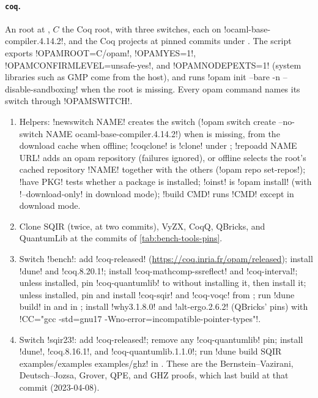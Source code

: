 {\paragraph{\texttt{coq}.} An  root at , $C$ the Coq root, with three switches, each on \code!ocaml-base-compiler.4.14.2!, and the Coq projects at pinned commits under . The script exports \code!OPAMROOT=C/opam!, \code!OPAMYES=1!, \code!OPAMCONFIRMLEVEL=unsafe-yes!, and \code!OPAMNODEPEXTS=1! (system libraries such as GMP come from the host), and runs \code!opam init --bare -n --disable-sandboxing! when the root is missing. Every opam command names its switch through \code!OPAMSWITCH!.
\begin{enumerate}
\item Helpers: \code!newswitch NAME! creates the switch (\code!opam switch create --no-switch NAME ocaml-base-compiler.4.14.2!) when  is missing, from the download cache when offline; \code!coqclone! is \code!clone! under ; \code!repoadd NAME URL! adds an opam repository (failures ignored), or offline selects the root's cached repository \code!NAME! together with the others (\code!opam repo set-repos!); \code!have PKG! tests whether a package is installed; \code!oinst! is \code!opam install! (with \code!--download-only! in download mode); \code!build CMD! runs \code!CMD! except in download mode.
\item Clone SQIR (twice, at two commits), VyZX, CoqQ, QBricks, and QuantumLib at the commits of \cref{tab:bench-tools-pins}.
\item Switch \code!bench!: add \code!coq-released! (\url{https://coq.inria.fr/opam/released}); install \code!dune! and \code!coq.8.20.1!; install \code!coq-mathcomp-ssreflect! and \code!coq-interval!; unless installed, pin \code!coq-quantumlib! to  without installing it, then install it; unless installed, pin and install \code!coq-sqir! and \code!coq-voqc! from ; run \code!dune build! in  and in ; install \code!why3.1.8.0! and \code!alt-ergo.2.6.2! (QBricks' pins) with \code!CC="gcc -std=gnu17 -Wno-error=incompatible-pointer-types"!.
\item Switch \code!sqir23!: add \code!coq-released!; remove any \code!coq-quantumlib! pin; install \code!dune!, \code!coq.8.16.1!, and \code!coq-quantumlib.1.1.0!; run \code!dune build SQIR examples/examples examples/ghz! in . These are the Bernstein--Vazirani, Deutsch--Jozsa, Grover, QPE, and GHZ proofs, which last build at that commit (2023-04-08).

\end{enumerate}}
